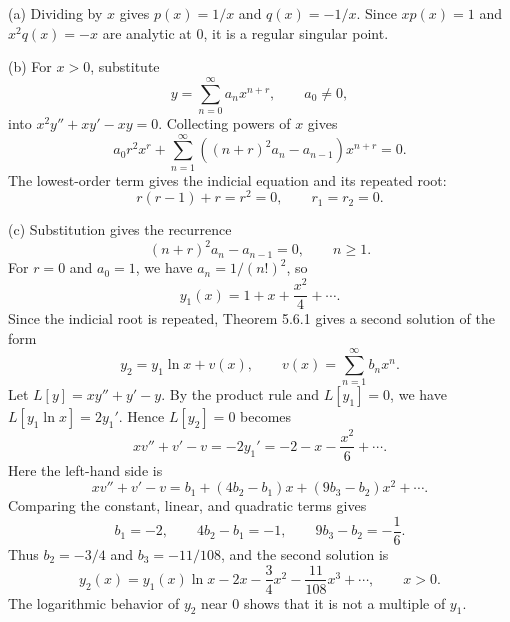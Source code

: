 \documentclass[11pt,oneside]{article}
\begin{document}
\begin{solution}
\noindent\textup{(a)} Dividing by $x$ gives $p(x)=1/x$ and $q(x)=-1/x$. Since $xp(x)=1$ and $x^2q(x)=-x$ are analytic at $0$, it is a regular singular point.

\noindent\textup{(b)} For $x>0$, substitute
\[
    y=\sum_{n=0}^{\infty}a_nx^{n+r}, \qquad a_0\ne0,
\]
into $x^2y''+xy'-xy=0$. Collecting powers of $x$ gives
\[
    a_0r^2x^r+\sum_{n=1}^{\infty}((n+r)^2a_n-a_{n-1})x^{n+r}=0.
\]
The lowest-order term gives the indicial equation and its repeated root:
\[
    \boxed{r(r-1)+r=r^2=0, \qquad r_1=r_2=0}.
\]

\noindent\textup{(c)} Substitution gives the recurrence
\[
    (n+r)^2a_n-a_{n-1}=0, \qquad n\geq1.
\]
For $r=0$ and $a_0=1$, we have $a_n=1/(n!)^2$, so
\[
    \boxed{y_1(x)=1+x+\frac{x^2}{4}+\cdots}.
\]
Since the indicial root is repeated, Theorem 5.6.1 gives a second solution of the form
\[
    y_2=y_1\ln x+v(x), \qquad v(x)=\sum_{n=1}^{\infty}b_nx^n.
\]
Let $L[y]=xy''+y'-y$. By the product rule and $L[y_1]=0$, we have $L[y_1\ln x]=2y_1'$. Hence $L[y_2]=0$ becomes
\[
    xv''+v'-v=-2y_1'=-2-x-\frac{x^2}{6}+\cdots.
\]
Here the left-hand side is
\[
    xv''+v'-v=b_1+(4b_2-b_1)x+(9b_3-b_2)x^2+\cdots.
\]
Comparing the constant, linear, and quadratic terms gives
\[
    b_1=-2, \qquad 4b_2-b_1=-1, \qquad 9b_3-b_2=-\frac16.
\]
Thus $b_2=-3/4$ and $b_3=-11/108$, and the second solution is
\[
    \boxed{y_2(x)=y_1(x)\ln x-2x-\frac34x^2-\frac{11}{108}x^3+\cdots},
    \qquad x>0.
\]
The logarithmic behavior of $y_2$ near $0$ shows that it is not a multiple of $y_1$.
\end{solution}
\end{document}
